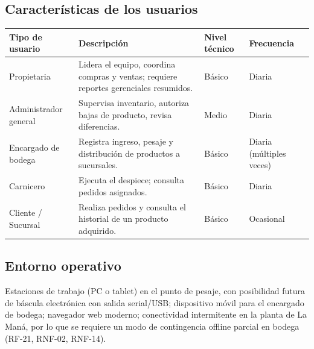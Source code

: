 \documentclass[11pt,a4paper]{article}
\begin{document}
\subsection{Características de los usuarios}
\begin{longtable}{|p{2.8cm}|p{5cm}|p{2cm}|p{2.5cm}|}
\hline
\textbf{Tipo de usuario} & \textbf{Descripción} & \textbf{Nivel técnico} & \textbf{Frecuencia} \\
\hline
Propietaria & Lidera el equipo, coordina compras y ventas; requiere reportes gerenciales resumidos. & Básico & Diaria \\
\hline
Administrador general & Supervisa inventario, autoriza bajas de producto, revisa diferencias. & Medio & Diaria \\
\hline
Encargado de bodega & Registra ingreso, pesaje y distribución de productos a sucursales. & Básico & Diaria (múltiples veces) \\
\hline
Carnicero & Ejecuta el despiece; consulta pedidos asignados. & Básico & Diaria \\
\hline
Cliente / Sucursal & Realiza pedidos y consulta el historial de un producto adquirido. & Básico & Ocasional \\
\hline
\end{longtable}

\subsection{Entorno operativo}
Estaciones de trabajo (PC o tablet) en el punto de pesaje, con posibilidad futura de báscula electrónica con salida serial/USB; dispositivo móvil para el encargado de bodega; navegador web moderno; conectividad intermitente en la planta de La Maná, por lo que se requiere un modo de contingencia offline parcial en bodega (RF-21, RNF-02, RNF-14).
\end{document}
